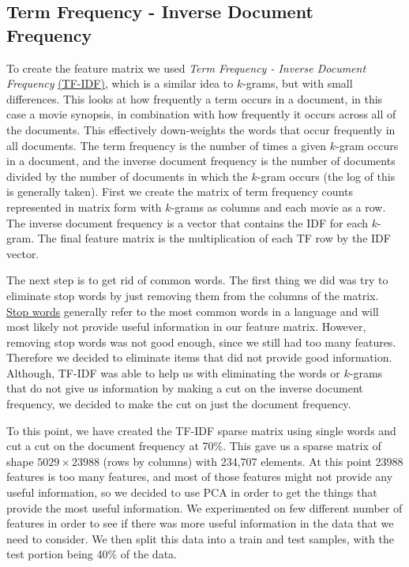 \documentclass[11pt]{article}
\begin{document}
\subsection{Term Frequency - Inverse Document Frequency}
\label{sec:tfidf}

To create the feature matrix we used {\it Term Frequency - Inverse Document Frequency} \href{https://en.wikipedia.org/wiki/Tf\%E2\%80\%93idf}{(TF-IDF)}, which is a similar idea to $k$-grams, but with small differences.  This looks at how frequently a term occurs in a document, in this case a movie synopsis, in combination with how frequently it occurs across all of the documents. This effectively down-weights the words that occur frequently in all documents. The term frequency is the number of times a given $k$-gram occurs in a document, and the inverse document frequency is the number of documents divided by the number of documents in which the $k$-gram occurs (the log of this is generally taken). First we create the matrix of term frequency counts represented in matrix form with $k$-grams as columns and each movie as a row. The inverse document frequency is a vector that contains the IDF for each $k$-gram. The final feature matrix is the multiplication of each TF row by the IDF vector.

The next step is to get rid of common words. The first thing we did was try to eliminate stop words by just removing them from the columns of the matrix. \href{https://en.wikipedia.org/wiki/Stop_words}{Stop words} generally refer to the most common words in a language and will most likely not provide useful information in our feature matrix. However, removing stop words was not good enough, since we still had too many features.  Therefore we decided to eliminate items that did not provide good information. 
Although, TF-IDF was able to help us with eliminating the words or $k$-grams that do not give us information by making a cut on the inverse document frequency, we decided to make the cut on just the document frequency. 

To this point, we have created the TF-IDF sparse matrix using single words and cut a cut on the document frequency at 70\%. This gave us a sparse matrix of shape $5029 \times 23988$ (rows by columns) with 234,707 elements. At this point 23988 features is too many features, and most of those features might not provide any useful information, so we decided to use PCA in order to get the things that provide the most useful information. We experimented on few different number of features in order to see if there was more useful information in the data that we need to consider. We then split this data into a train and test samples, with the test portion being 40\% of the data. 
\end{document}
